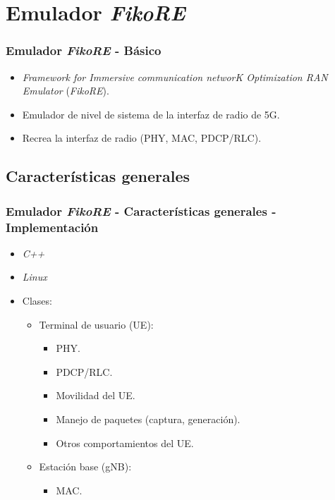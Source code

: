 \documentclass{beamer}
\begin{document}
\section{Emulador \textit{FikoRE}}

\begin{frame}
\frametitle{Emulador \textit{FikoRE} - Básico}

\begin{itemize}
\item \textit{Framework for Immersive communication networK Optimization RAN Emulator} (\textit{FikoRE}).
\item Emulador de nivel de sistema de la interfaz de radio de 5G.
\item Recrea la interfaz de radio (PHY, MAC, PDCP/RLC).
\end{itemize}
\end{frame}

\subsection{Características generales}

\begin{frame}
\frametitle{Emulador \textit{FikoRE} - Características generales - Implementación}

\begin{itemize}
\item \textit{C++}
\item \textit{Linux}
\item {
	Clases:
	\begin{itemize}
	\item {
		Terminal de usuario (UE):
		\begin{itemize}
		\item PHY.
		\item PDCP/RLC.
		\item Movilidad del UE.
		\item Manejo de paquetes (captura, generación).
		\item Otros comportamientos del UE.
		\end{itemize}
	}
	\item {
		Estación base (gNB):
		\begin{itemize}
		\item MAC.
		\end{itemize}
	}
	\end{itemize}
}
\end{itemize}
\end{frame}
\end{document}

